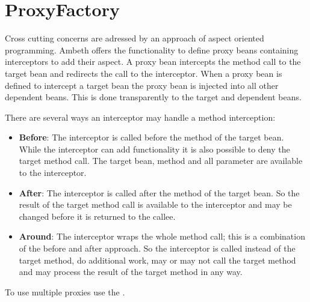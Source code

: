 \section{ProxyFactory}
\label{feature:ProxyFactory}
\ClearAPI
Cross cutting concerns are adressed by an approach of aspect oriented programming. Ambeth offers the functionality to define proxy beans containing interceptors to add their aspect. A proxy bean intercepts the method call to the target bean and redirects the call to the interceptor. When a proxy bean is defined to intercept a target bean the proxy bean is injected into all other dependent beans. This is done transparently to the target and dependent beans.

\def\showimgref{img/proxybeans1.png}

There are several ways an interceptor may handle a method interception:

\begin{itemize}
	\item \textbf{Before}: The interceptor is called before the method of the target bean. While the interceptor can add functionality it is also possible to deny the target method call. The target bean, method and all parameter are available to the interceptor.
	\item \textbf{After}: The interceptor is called after the method of the target bean. So the result of the target method call is available to the interceptor and may be changed before it is returned to the callee.
	\item \textbf{Around}: The interceptor wraps the whole method call; this is a combination of the before and after approach. So the interceptor is called instead of the target method, do additional work, may or may not call the target method and may process the result of the target method in any way.
\end{itemize}
 
To use multiple proxies use the .
